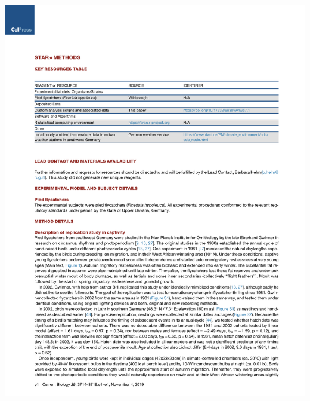 \documentclass[a4paper, twoside]{templates/ociamthesis}
\begin{document}
\begin{center}\includegraphics[width=1\linewidth]{pdf_chapters/pied/pied_crop_Part07} \end{center}
\end{document}
